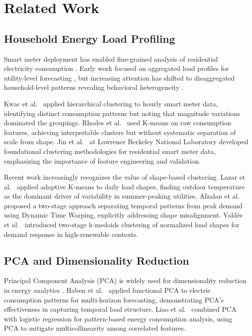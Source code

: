 \section{Related Work}
\label{sec:related}

\subsection{Household Energy Load Profiling}

Smart meter deployment has enabled fine-grained analysis of residential electricity consumption \cite{kwac2014household,rhodes2014clustering}. Early work focused on aggregated load profiles for utility-level forecasting \cite{haben2016analysis}, but increasing attention has shifted to disaggregated household-level patterns revealing behavioral heterogeneity \cite{lazar2021investigating,jin2016loadshape}.

Kwac et al.~\cite{kwac2014household} applied hierarchical clustering to hourly smart meter data, identifying distinct consumption patterns but noting that magnitude variations dominated the groupings. Rhodes et al.~\cite{rhodes2014clustering} used K-means on raw consumption features, achieving interpretable clusters but without systematic separation of scale from shape. Jin et al.~\cite{jin2016loadshape} at Lawrence Berkeley National Laboratory developed foundational clustering methodologies for residential smart meter data, emphasizing the importance of feature engineering and validation.

Recent work increasingly recognizes the value of shape-based clustering. Lazar et al.~\cite{lazar2021investigating} applied adaptive K-means to daily load shapes, finding outdoor temperature as the dominant driver of variability in summer-peaking utilities. Afzalan et al.~\cite{afzalan2020twostage} proposed a two-stage approach separating temporal patterns from peak demand using Dynamic Time Warping, explicitly addressing shape misalignment. Vald\'es et al.~\cite{valdes2021smart} introduced two-stage k-medoids clustering of normalized load shapes for demand response in high-renewable contexts.

\subsection{PCA and Dimensionality Reduction}

Principal Component Analysis (PCA) is widely used for dimensionality reduction in energy analytics \cite{jolliffe2002pca}. Haben et al.~\cite{haben2019fpca} applied functional PCA to electric consumption patterns for multi-horizon forecasting, demonstrating PCA's effectiveness in capturing temporal load structure. Liao et al.~\cite{liao2016pattern} combined PCA with logistic regression for pattern-based energy consumption analysis, using PCA to mitigate multicollinearity among correlated features.

